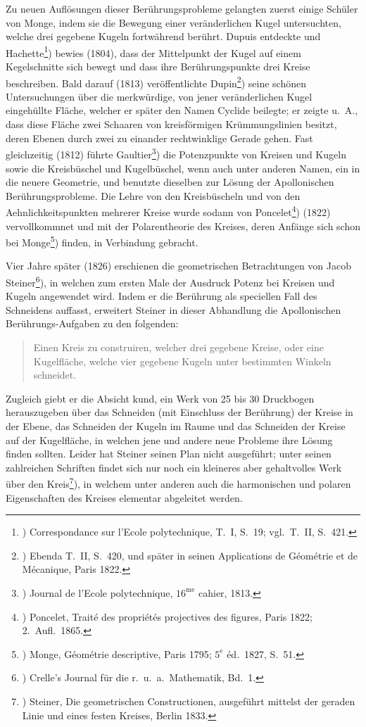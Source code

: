 Zu neuen Auf\/l\"osungen dieser Ber\"uhrungsprobleme gelangten
zuerst einige Sch\"uler von Monge, indem sie die
Bewegung einer ver\"anderlichen Kugel untersuchten, welche
drei gegebene Kugeln fortw\"ahrend ber\"uhrt. Dupuis entdeckte
und Hachette\footnote{)
  Correspondance sur l'Ecole polytechnique, T.~I, S.~19;
  vgl.\ T.~II, S.~421.})
bewies (1804), dass der Mittelpunkt der
Kugel auf einem Kegelschnitte sich bewegt und dass ihre
Ber\"uhrungspunkte drei Kreise beschreiben. Bald darauf (1813)
ver\"offentlichte Dupin\footnote{)
  Ebenda T.~II, S.~420, und sp\"ater in seinen Applications de
  G\'{e}om\'{e}trie
  et de M\'{e}canique, Paris 1822.})
seine sch\"onen Untersuchungen \"uber
die merkw\"urdige, von jener ver\"anderlichen Kugel eingeh\"ullte
Fl\"ache, welcher er sp\"ater den Namen Cyclide beilegte; er
zeigte u.~A., dass diese Fl\"ache zwei Schaaren von kreisf\"ormigen
Kr\"ummungslinien besitzt, deren Ebenen durch zwei
zu einander rechtwinklige Gerade gehen. Fast gleichzeitig
(1812) f\"uhrte Gaultier\footnote{)
  Journal de l'Ecole polytechnique, $16^{\text{me}}$ cahier, 1813.})
die Potenzpunkte von Kreisen und
Kugeln sowie die Kreisb\"uschel und Kugelb\"uschel, wenn auch
unter anderen Namen, ein in die neuere Geometrie, und benutzte
dieselben zur L\"osung der Apollonischen Ber\"uhrungsprobleme.
Die Lehre von den Kreisb\"uscheln und von den
Aehnlichkeitspunkten mehrerer Kreise wurde sodann von
Pon\-ce\-let\footnote{)
  Poncelet, Trait\'e des propri\'et\'es projectives des figures, Paris
  1822;
  2.~Aufl.~1865.})
(1822) vervollkommnet und mit der Polarentheorie
des Kreises, deren Anf\"ange sich schon bei Monge\footnote{)
  Monge, G\'eom\'etrie descriptive, Paris 1795; $5^{\text{e}}$
  \'ed.~1827, S.~51.})
finden,
in Verbindung gebracht.

Vier Jahre sp\"ater (1826) erschienen die {\glqq}geometrischen
Betrachtungen{\grqq} von Jacob Steiner\footnote{)
  Crelle's Journal f\"ur die r.~u.~a.\ Mathematik, Bd.~1.}),
in welchen zum ersten
Male der Ausdruck {\glqq}Potenz{\grqq} bei Kreisen und Kugeln angewendet
wird. Indem er die Ber\"uhrung als speciellen Fall des
Schneidens auf\/fasst, erweitert Steiner in dieser Abhandlung
die Apollonischen Ber\"uhrungs-Aufgaben zu den folgenden:
\begin{quote}
  {\glqq}Einen Kreis zu construiren, welcher drei gegebene
  Kreise, oder eine Kugelfl\"ache, welche vier gegebene
  Kugeln unter bestimmten Winkeln schneidet.{\grqq}
\end{quote}
Zugleich giebt er die Absicht kund, ein Werk von 25 bis
30 Druckbogen herauszugeben \"uber {\glqq}das Schneiden (mit Einschluss
der Ber\"uhrung) der Kreise in der Ebene, das Schneiden
der Kugeln im Raume und das Schneiden der Kreise auf
der Kugelfl\"ache{\grqq}, in welchen jene und andere neue Probleme
ihre L\"osung finden sollten. Leider hat Steiner seinen Plan
nicht ausgef\"uhrt; unter seinen zahlreichen Schriften findet
sich nur noch ein kleineres aber gehaltvolles Werk \"uber
den Kreis\footnote{)
  Steiner, Die geometrischen Constructionen, ausgef\"uhrt mittelst
  der geraden Linie und eines festen Kreises, Berlin 1833.}),
in welchem unter anderen auch die harmonischen
und polaren Eigenschaften des Kreises elementar
abgeleitet werden.

